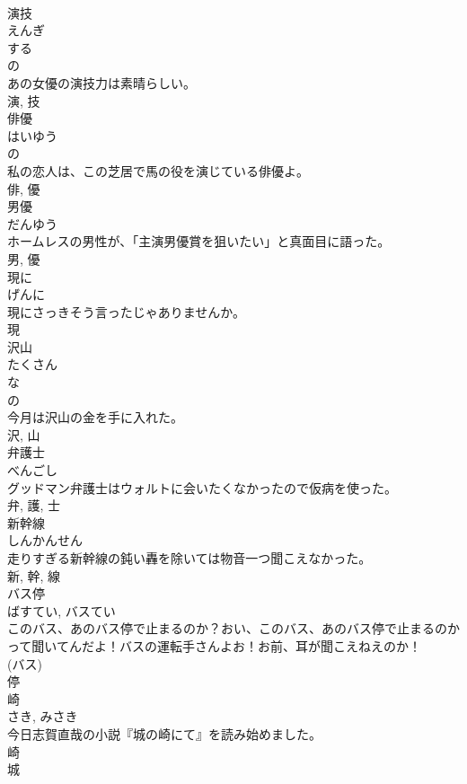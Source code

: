 \documentclass[8pt]{extreport}
\begin{document}
\begin{CJK}{UTF8}{min}
\\	演技	
\\	えんぎ	
\\	する 
\\	の 
\\	あの女優の演技力は素晴らしい。	
\\	演, 技	
\\	俳優	
\\	はいゆう	
\\	の 
\\	私の恋人は、この芝居で馬の役を演じている俳優よ。	
\\	俳, 優	
\\	男優	
\\	だんゆう	
\\	ホームレスの男性が、「主演男優賞を狙いたい」と真面目に語った。	
\\	男, 優	
\\	現に	
\\	げんに	
\\	現にさっきそう言ったじゃありませんか。	
\\	現	
\\	沢山	
\\	たくさん	
\\	な 
\\	の 
\\	今月は沢山の金を手に入れた。	
\\	沢, 山	
\\	弁護士	
\\	べんごし	
\\	グッドマン弁護士はウォルトに会いたくなかったので仮病を使った。	
\\	弁, 護, 士	
\\	新幹線	
\\	しんかんせん	
\\	走りすぎる新幹線の鈍い轟を除いては物音一つ聞こえなかった。	
\\	新, 幹, 線	
\\	バス停	
\\	ばすてい, バスてい	
\\	このバス、あのバス停で止まるのか？おい、このバス、あのバス停で止まるのかって聞いてんだよ！バスの運転手さんよお！お前、耳が聞こえねえのか！	
\\	(バス) 
\\	停	
\\	崎	
\\	さき, みさき	
\\	今日志賀直哉の小説『城の崎にて』を読み始めました。	
\\	崎	
\\	城	

\end{CJK}
\end{document}

